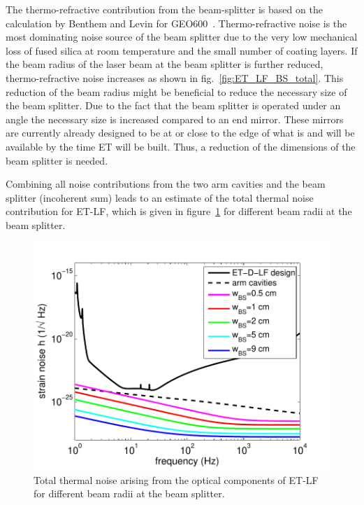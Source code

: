The thermo-refractive contribution from the beam-splitter is based on the calculation by Benthem and Levin for GEO600~\cite{Benthem2009}. Thermo-refractive noise is the most dominating noise source of the beam splitter due to the very low mechanical loss of fused silica at room temperature and the small number of coating layers. If the beam radius of the laser beam at the beam splitter is further reduced, thermo-refractive noise increases as shown in fig.~\ref{fig:ET_LF_BS_total}. This reduction of the beam radius might be beneficial to reduce the necessary size of the beam splitter. Due to the fact that the beam splitter is operated under an angle the necessary size is increased compared to an end mirror. These mirrors are currently already designed to be at or close to the edge of what is and will be available by the time ET will be built. Thus, a reduction of the dimensions of the beam splitter is needed. 
 
Combining all noise contributions from the two arm cavities and the beam splitter (incoherent sum) leads to an estimate of the total thermal noise contribution for ET-LF, which is given in figure~\ref{fig:ET_LF_total_TN} for different beam radii at the beam splitter.

\begin{figure}[!h]
\begin{center}
\includegraphics[scale=0.7]{Sec_Optics/ET_LF_noise.pdf}
\end{center}
\caption{Total thermal noise arising from the optical components of ET-LF for different beam radii at the beam splitter.}
\label{fig:ET_LF_total_TN}
\end{figure}

